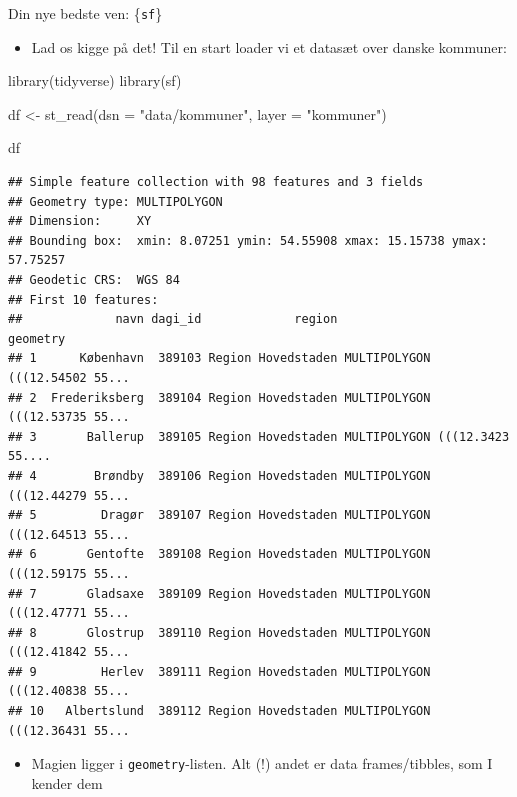 \documentclass[
  8pt,
  ignorenonframetext,
  aspectratio=169]{beamer}
\newenvironment{Shaded}{}{}
\newcommand{\AttributeTok}[1]{\textcolor[rgb]{0.49,0.56,0.16}{#1}}
\newcommand{\FunctionTok}[1]{\textcolor[rgb]{0.02,0.16,0.49}{#1}}
\newcommand{\NormalTok}[1]{#1}
\newcommand{\OtherTok}[1]{\textcolor[rgb]{0.00,0.44,0.13}{#1}}
\newcommand{\StringTok}[1]{\textcolor[rgb]{0.25,0.44,0.63}{#1}}
\providecommand{\tightlist}{%
  \setlength{\itemsep}{0pt}\setlength{\parskip}{0pt}}
\begin{document}
\begin{frame}[fragile]{Din nye bedste ven: \{\texttt{sf}\}}
\protect\hypertarget{din-nye-bedste-ven-sf}{}
\begin{itemize}
\tightlist
\item
  Lad os kigge på det! Til en start loader vi et datasæt over danske
  kommuner:
\end{itemize}

\tiny

\begin{Shaded}
\begin{Highlighting}[]
\FunctionTok{library}\NormalTok{(tidyverse)}
\FunctionTok{library}\NormalTok{(sf)}

\NormalTok{df }\OtherTok{\textless{}{-}} \FunctionTok{st\_read}\NormalTok{(}\AttributeTok{dsn =} \StringTok{"data/kommuner"}\NormalTok{,}
              \AttributeTok{layer =} \StringTok{"kommuner"}\NormalTok{)}
\end{Highlighting}
\end{Shaded}

\normalsize

\tiny

\begin{Shaded}
\begin{Highlighting}[]
\NormalTok{df}
\end{Highlighting}
\end{Shaded}

\begin{verbatim}
## Simple feature collection with 98 features and 3 fields
## Geometry type: MULTIPOLYGON
## Dimension:     XY
## Bounding box:  xmin: 8.07251 ymin: 54.55908 xmax: 15.15738 ymax: 57.75257
## Geodetic CRS:  WGS 84
## First 10 features:
##             navn dagi_id             region                       geometry
## 1      København  389103 Region Hovedstaden MULTIPOLYGON (((12.54502 55...
## 2  Frederiksberg  389104 Region Hovedstaden MULTIPOLYGON (((12.53735 55...
## 3       Ballerup  389105 Region Hovedstaden MULTIPOLYGON (((12.3423 55....
## 4        Brøndby  389106 Region Hovedstaden MULTIPOLYGON (((12.44279 55...
## 5         Dragør  389107 Region Hovedstaden MULTIPOLYGON (((12.64513 55...
## 6       Gentofte  389108 Region Hovedstaden MULTIPOLYGON (((12.59175 55...
## 7       Gladsaxe  389109 Region Hovedstaden MULTIPOLYGON (((12.47771 55...
## 8       Glostrup  389110 Region Hovedstaden MULTIPOLYGON (((12.41842 55...
## 9         Herlev  389111 Region Hovedstaden MULTIPOLYGON (((12.40838 55...
## 10   Albertslund  389112 Region Hovedstaden MULTIPOLYGON (((12.36431 55...
\end{verbatim}

\normalsize

\begin{itemize}
\tightlist
\item
  Magien ligger i \texttt{geometry}-listen. Alt (!) andet er data
  frames/tibbles, som I kender dem
\end{itemize}
\end{frame}
\end{document}
